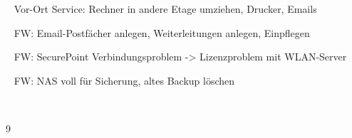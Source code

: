 {{	\textbullet~ Vor-Ort Service: Rechner in andere Etage umziehen, Drucker, Emails\par
	\textbullet~ FW: Email-Postfächer anlegen, Weiterleitungen anlegen, Einpflegen\par
	\textbullet~ FW: SecurePoint Verbindungsproblem -> Lizenzproblem mit WLAN-Server\par
	\textbullet~ FW: NAS voll für Sicherung, altes Backup löschen\par
	\textbullet~ 
	}{}{9}
}{}
\Unterschrift
\newpage
